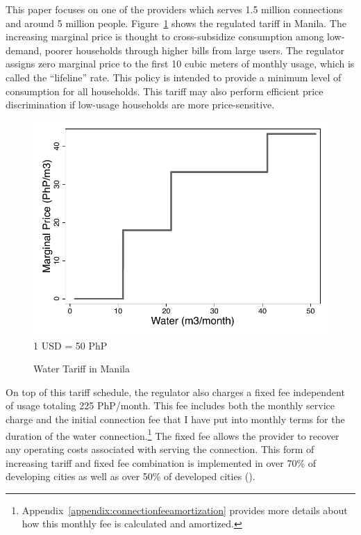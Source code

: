 \documentclass[12pt]{article}
\begin{document}
This paper focuses on one of the providers which serves 1.5 million connections and around 5 million people.  Figure~\ref{figure:tariff} shows the regulated tariff in Manila.  The increasing marginal price is thought to cross-subsidize consumption among low-demand, poorer households through higher bills from large users.  The regulator assigns zero marginal price to the first 10 cubic meters of monthly usage, which is called the ``lifeline'' rate.  This policy is intended to provide a minimum level of consumption for all households.  This tariff may also perform efficient price discrimination if low-usage households are more price-sensitive.
\begin{figure}
\centering
\caption{Water Tariff in Manila}\label{figure:tariff}
\begin{center}
\includegraphics[scale=.7]{tables/tariff_structure.pdf}\\
\footnotesize{1 USD = 50 PhP}
\end{center}
\end{figure}
On top of this tariff schedule, the regulator also charges a fixed fee independent of usage totaling 225 PhP/month.  This fee includes both the monthly service charge and the initial connection fee that I have put into monthly terms for the duration of the water connection.\footnote{Appendix~\ref{appendix:connectionfeeamortization} provides more details about how this monthly fee is calculated and amortized.}  The fixed fee allows the provider to recover any operating costs associated with serving the connection.  This form of increasing tariff and fixed fee combination is implemented in over 70\% of developing cities as well as over 50\% of developed cities (\cite{hoque2013state}).
\end{document}
